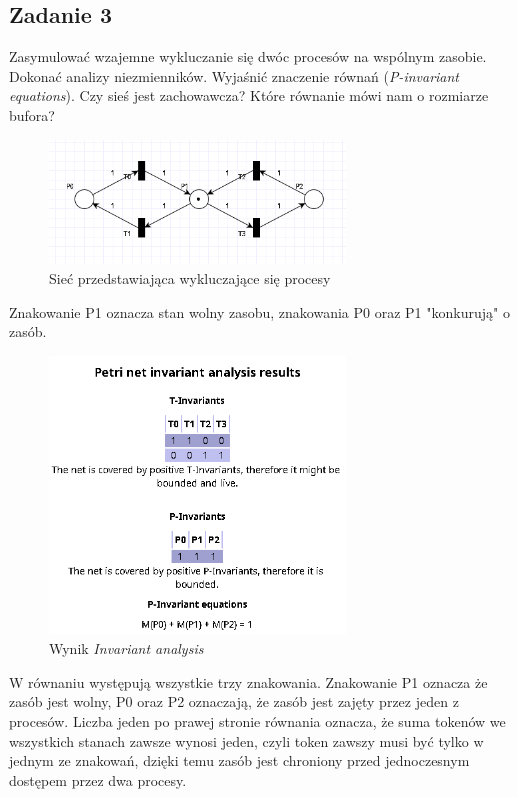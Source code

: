 \documentclass{article}
\begin{document}
\subsection{Zadanie 3}
Zasymulować wzajemne wykluczanie się dwóc procesów na wspólnym zasobie. Dokonać analizy niezmienników.
Wyjaśnić znaczenie równań (\textit{P-invariant equations}). Czy sieś jest zachowawcza? Które równanie
mówi nam o rozmiarze bufora?

\begin{figure}[H]
    \centering
    \includegraphics[width=0.7\textwidth]{net_3.png}
    \caption{Sieć przedstawiająca wykluczające się procesy}
\end{figure}

Znakowanie P1 oznacza stan wolny zasobu, znakowania P0 oraz P1 "konkurują" o zasób.

\begin{figure}[H]
    \centering
    \includegraphics[width=0.7\textwidth]{invariant_3.png}
    \caption{Wynik \textit{Invariant analysis}}
\end{figure}

W równaniu występują wszystkie trzy znakowania. Znakowanie P1 oznacza że zasób jest wolny, P0 oraz P2
oznaczają, że zasób jest zajęty przez jeden z procesów. Liczba jeden po prawej stronie równania
oznacza, że suma tokenów we wszystkich stanach zawsze wynosi jeden, czyli token zawszy musi 
być tylko w jednym ze znakowań, dzięki temu zasób jest chroniony przed jednoczesnym dostępem przez dwa
procesy.
\end{document}
